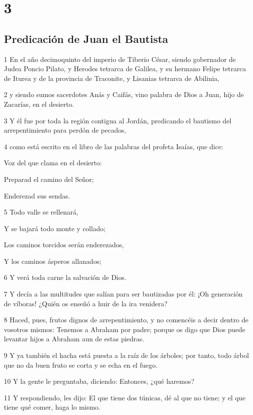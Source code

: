 \chapter{3}

\section*{Predicación de Juan el Bautista}

\par 1 En el año decimoquinto del imperio de Tiberio César, siendo gobernador de Judea Poncio Pilato, y Herodes tetrarca de Galilea, y su hermano Felipe tetrarca de Iturea y de la provincia de Traconite, y Lisanias tetrarca de Abilinia,
\par 2 y siendo sumos sacerdotes Anás y Caifás, vino palabra de Dios a Juan, hijo de Zacarías, en el desierto.
\par 3 Y él fue por toda la región contigua al Jordán, predicando el bautismo del arrepentimiento para perdón de pecados,
\par 4 como está escrito en el libro de las palabras del profeta Isaías, que dice:
\par Voz del que clama en el desierto:
\par Preparad el camino del Señor;
\par Enderezad sus sendas.
\par 5 Todo valle se rellenará,
\par Y se bajará todo monte y collado;
\par Los caminos torcidos serán enderezados,
\par Y los caminos ásperos allanados;
\par 6 Y verá toda carne la salvación de Dios.
\par 7 Y decía a las multitudes que salían para ser bautizadas por él: ¡Oh generación de víboras! ¿Quién os enseñó a huir de la ira venidera?
\par 8 Haced, pues, frutos dignos de arrepentimiento, y no comencéis a decir dentro de vosotros mismos: Tenemos a Abraham por padre; porque os digo que Dios puede levantar hijos a Abraham aun de estas piedras.
\par 9 Y ya también el hacha está puesta a la raíz de los árboles; por tanto, todo árbol que no da buen fruto se corta y se echa en el fuego.
\par 10 Y la gente le preguntaba, diciendo: Entonces, ¿qué haremos?
\par 11 Y respondiendo, les dijo: El que tiene dos túnicas, dé al que no tiene; y el que tiene qué comer, haga lo mismo.
